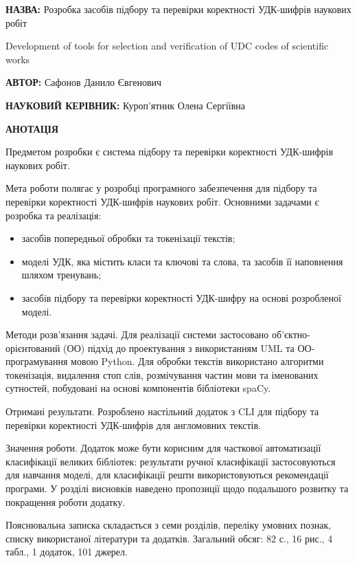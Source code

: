 \documentclass[14pt]{extarticle}
\begin{document}
\noindent
\textbf{НАЗВА:} Розробка засобів підбору та перевірки коректності
УДК-шифрів наукових робіт

\noindent
Development of tools for selection and
verification of UDC codes of scientific works

\vspace{\baselineskip}

\noindent
\textbf{АВТОР:} Сафонов Данило Євгенович

\noindent
\textbf{НАУКОВИЙ КЕРІВНИК:} Куроп'ятник Олена Сергіївна

\vspace{\baselineskip}

\noindent
\textbf{АНОТАЦІЯ}

Предметом розробки є система підбору та перевірки коректності
УДК-шифрів наукових робіт.

Мета роботи полягає у розробці програмного забезпечення
для підбору та перевірки коректності УДК-шифрів наукових робіт.
Основними задачами є розробка та реалізація:
\begin{itemize}[itemsep=1pt,labelindent=\dimexpr{}\relax, leftmargin=*]
  \item засобів попередньої обробки та токенізації текстів;
  \item моделі УДК, яка містить класи та ключові та слова, та засобів її наповнення шляхом тренувань;
  \item засобів підбору та перевірки коректності УДК-шифру на основі розробленої моделі.
\end{itemize}

Методи розв’язання задачі.
Для реалізації системи застосовано об’єктно-орієнтований (ОО)
підхід до проектування з використанням UML та ОО-програмування мовою Python.
Для обробки текстів використано алгоритми токенізація, видалення стоп слів,
розмічування частин мови та іменованих сутностей,
побудовані на основі компонентів бібліотеки spaCy.

Отримані результати.
Розроблено настільний додаток з CLI для підбору та перевірки коректності
УДК-шифрів для англомовних текстів.

Значення роботи. Додаток може бути корисним для часткової
автоматизації класифікації великих бібліотек: результати ручної класифікації
застосовуються для навчання моделі, для класифікації решти використовуються
рекомендації програми. У розділі висновків наведено пропозиції щодо
подальшого розвитку та покращення роботи додатку.

Пояснювальна записка складається з семи розділів, переліку умовних познак,
списку використаної літератури та додатків.
Загальний обсяг: 82 с., 16 рис., 4 табл., 1 додаток, 101 джерел.
\end{document}
